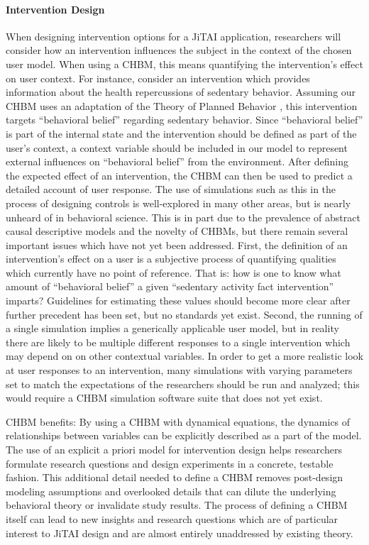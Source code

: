 \documentclass[runningheads,a4paper]{llncs}
\begin{document}
\paragraph{Intervention Design}
When designing intervention options for a JiTAI application, researchers will consider how an intervention influences the subject in the context of the chosen user model.
When using a CHBM, this means quantifying the intervention’s effect on user context.
For instance, consider an intervention which provides information about the health repercussions of sedentary behavior.
Assuming our CHBM uses an adaptation of the Theory of Planned Behavior \cite{Bandura???}, this intervention targets “behavioral belief” regarding sedentary behavior.
Since “behavioral belief” is part of the internal state and the intervention should be defined as part of the user’s context, a context variable should be included in our model to represent external influences on “behavioral belief” from the environment.
After defining the expected effect of an intervention, the CHBM can then be used to predict a detailed account of user response.
The use of simulations such as this in the process of designing controls is well-explored in many other areas, but is nearly unheard of in behavioral science.
This is in part due to the prevalence of abstract causal descriptive models and the novelty of CHBMs, but there remain several important issues which have not yet been addressed.
First, the definition of an intervention’s effect on a user is a subjective process of quantifying qualities which currently have no point of reference.
That is: how is one to know what amount of “behavioral belief” a given “sedentary activity fact intervention” imparts?
Guidelines for estimating these values should become more clear after further precedent has been set, but no standards yet exist.
Second, the running of a single simulation implies a generically applicable user model, but in reality there are likely to be multiple different responses to a single intervention which may depend on on other contextual variables. 
In order to get a more realistic look at user responses to an intervention, many simulations with varying parameters set to match the expectations of the researchers should be run and analyzed; this would require a CHBM simulation software suite that does not yet exist.

CHBM benefits: 
By using a CHBM with dynamical equations, the dynamics of relationships between variables can be explicitly described as a part of the model.
The use of an explicit a priori model for intervention design helps researchers formulate research questions and design experiments in a concrete, testable fashion.
This additional detail needed to define a CHBM removes post-design modeling assumptions and overlooked details that can dilute the underlying behavioral theory or invalidate study results.
The process of defining a CHBM itself can lead to new insights and research questions which are of particular interest to JiTAI design and are almost entirely unaddressed by existing theory.
\end{document}
